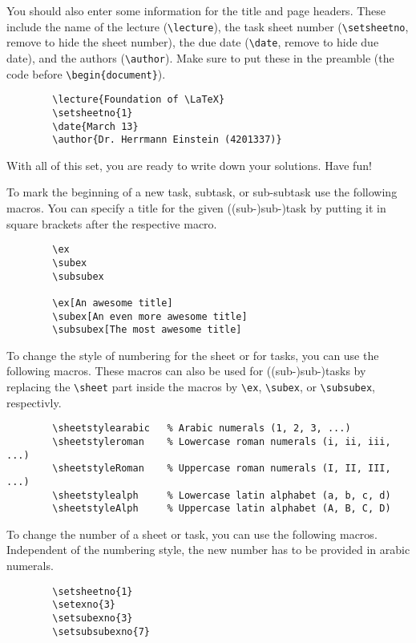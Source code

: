 \documentclass[10pt,a4paper,english]{article}
\begin{document}
    You should also enter some information for the title and page headers.
    These include the name of the lecture (\verb|\lecture|), 
    the task sheet number (\verb|\setsheetno|, remove to hide the sheet number), 
    the due date (\verb|\date|, remove to hide due date),
    and the authors (\verb|\author|). 
    Make sure to put these in the preamble (the code before \verb|\begin{document}|).
    \begin{verbatim}
        \lecture{Foundation of \LaTeX}
        \setsheetno{1}
        \date{March 13}
        \author{Dr. Herrmann Einstein (4201337)}
    \end{verbatim}

    With all of this set, you are ready to write down your solutions.
    Have fun!

    \pagebreak
    To mark the beginning of a new task, subtask, or sub-subtask use the following macros.
    You can specify a title for the given ((sub-)sub-)task by putting it in square brackets after the respective macro.
    \begin{verbatim}
        \ex
        \subex
        \subsubex

        \ex[An awesome title]
        \subex[An even more awesome title]
        \subsubex[The most awesome title]
    \end{verbatim}

    To change the style of numbering for the sheet or for tasks, you can use the following macros.
    These macros can also be used for ((sub-)sub-)tasks by replacing the \verb|\sheet| part inside the macros by \verb|\ex|, \verb|\subex|, or \verb|\subsubex|, respectivly.
    \begin{verbatim}
        \sheetstylearabic   % Arabic numerals (1, 2, 3, ...)
        \sheetstyleroman    % Lowercase roman numerals (i, ii, iii, ...)
        \sheetstyleRoman    % Uppercase roman numerals (I, II, III, ...)
        \sheetstylealph     % Lowercase latin alphabet (a, b, c, d)
        \sheetstyleAlph     % Uppercase latin alphabet (A, B, C, D)
    \end{verbatim}

    To change the number of a sheet or task, you can use the following macros.
    Independent of the numbering style, the new number has to be provided in arabic numerals.
    \begin{verbatim}
        \setsheetno{1}
        \setexno{3}
        \setsubexno{3}
        \setsubsubexno{7}
    \end{verbatim}
\end{document}
